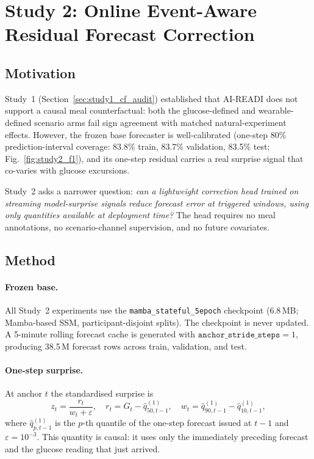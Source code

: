 \section{Study 2: Online Event-Aware Residual Forecast Correction}
\label{sec:study2}

\subsection{Motivation}
\label{subsec:study2_motivation}

Study~1 (Section~\ref{sec:study1_cf_audit}) established that AI-READI does not
support a causal meal counterfactual: both the glucose-defined and
wearable-defined scenario arms fail sign agreement with matched
natural-experiment effects.
However, the frozen base forecaster is well-calibrated (one-step 80\%
prediction-interval coverage: 83.8\% train, 83.7\% validation, 83.5\% test;
Fig.~\ref{fig:study2_f1}), and its one-step residual carries a real surprise
signal that co-varies with glucose excursions.

Study~2 asks a narrower question:
\emph{can a lightweight correction head trained on streaming model-surprise
signals reduce forecast error at triggered windows, using only quantities
available at deployment time?}
The head requires no meal annotations, no scenario-channel supervision,
and no future covariates.

\subsection{Method}
\label{subsec:study2_method}

\paragraph{Frozen base.}
All Study~2 experiments use the \texttt{mamba\_stateful\_5epoch} checkpoint
(6.8\,MB; Mamba-based SSM, participant-disjoint splits).
The checkpoint is never updated.
A 5-minute rolling forecast cache is generated with
$\mathtt{anchor\_stride\_steps}=1$, producing 38.5\,M forecast rows across
train, validation, and test.

\paragraph{One-step surprise.}
At anchor $t$ the standardised surprise is
\begin{equation}
  z_t = \frac{r_t}{w_t + \varepsilon},
  \quad
  r_t = G_t - \hat{q}_{50,t-1}^{(1)},
  \quad
  w_t = \hat{q}_{90,t-1}^{(1)} - \hat{q}_{10,t-1}^{(1)},
  \label{eq:s2_zt}
\end{equation}
where $\hat{q}_{p,t-1}^{(1)}$ is the $p$-th quantile of the one-step
forecast issued at $t-1$ and $\varepsilon=10^{-3}$.
This quantity is causal: it uses only the immediately preceding forecast
and the glucose reading that just arrived.

